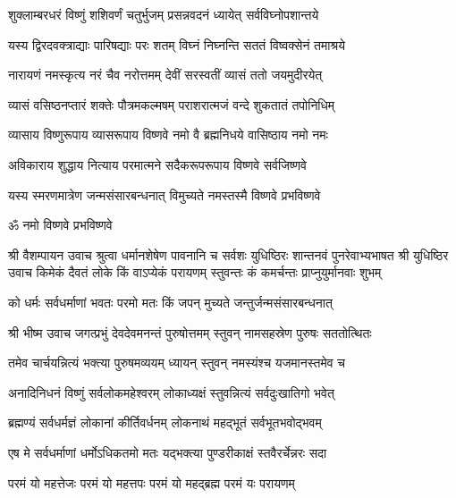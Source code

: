 
\twolineshloka
{शुक्लाम्बरधरं विष्णुं शशिवर्णं चतुर्भुजम्}
{प्रसन्नवदनं ध्यायेत् सर्वविघ्नोपशान्तये}

\twolineshloka
{यस्य द्विरदवक्त्राद्याः पारिषद्याः परः शतम्}
{विघ्नं निघ्नन्ति सततं विष्वक्सेनं तमाश्रये}

\twolineshloka
{नारायणं नमस्कृत्य नरं चैव नरोत्तमम्}
{देवीं सरस्वतीं व्यासं ततो जयमुदीरयेत्}

\twolineshloka
{व्यासं वसिष्ठनप्तारं शक्तेः पौत्रमकल्मषम्}
{पराशरात्मजं वन्दे शुकतातं तपोनिधिम्}

\twolineshloka
{व्यासाय विष्णुरूपाय व्यासरूपाय विष्णवे}
{नमो वै ब्रह्मनिधये वासिष्ठाय नमो नमः}

\twolineshloka
{अविकाराय शुद्धाय नित्याय परमात्मने}
{सदैकरूपरूपाय विष्णवे सर्वजिष्णवे}

\twolineshloka
{यस्य स्मरणमात्रेण जन्मसंसारबन्धनात्}
{विमुच्यते नमस्तस्मै विष्णवे प्रभविष्णवे}

\centerline{ॐ नमो विष्णवे प्रभविष्णवे}
श्री वैशम्पायन उवाच
\twolineshloka
{श्रुत्वा धर्मानशेषेण पावनानि च सर्वशः}
{युधिष्ठिरः शान्तनवं पुनरेवाभ्यभाषत}
श्री युधिष्ठिर उवाच
\twolineshloka
{किमेकं दैवतं लोके किं वाऽप्येकं परायणम्}
{स्तुवन्तः कं कमर्चन्तः प्राप्नुयुर्मानवाः शुभम्}

\twolineshloka
{को धर्मः सर्वधर्माणां भवतः परमो मतः}
{किं जपन् मुच्यते जन्तुर्जन्मसंसारबन्धनात्}

श्री भीष्म उवाच
\twolineshloka
{जगत्प्रभुं देवदेवमनन्तं पुरुषोत्तमम्}
{स्तुवन् नामसहस्रेण पुरुषः सततोत्थितः}

\twolineshloka
{तमेव चार्चयन्नित्यं भक्त्या पुरुषमव्ययम्}
{ध्यायन् स्तुवन् नमस्यंश्च यजमानस्तमेव च}

\twolineshloka
{अनादिनिधनं विष्णुं सर्वलोकमहेश्वरम्}
{लोकाध्यक्षं स्तुवन्नित्यं सर्वदुःखातिगो भवेत्}

\twolineshloka
{ब्रह्मण्यं सर्वधर्मज्ञं लोकानां कीर्तिवर्धनम्}
{लोकनाथं महद्भूतं सर्वभूतभवोद्भवम्}

\twolineshloka
{एष मे सर्वधर्माणां धर्मोऽधिकतमो मतः}
{यद्भक्त्या पुण्डरीकाक्षं स्तवैरर्चेन्नरः सदा}

\twolineshloka
{परमं यो महत्तेजः परमं यो महत्तपः}
{परमं यो महद्ब्रह्म परमं यः परायणम्}

